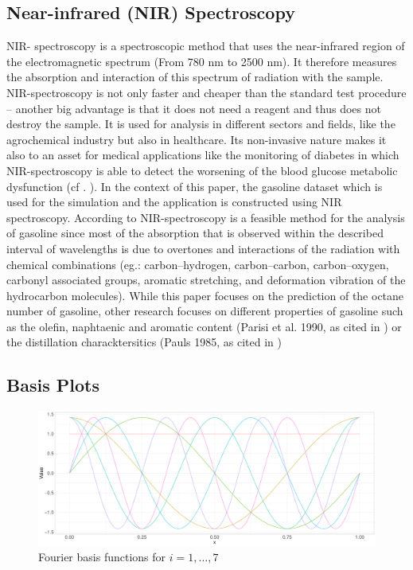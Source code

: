 \documentclass[11pt,twoside,a4paper]{article}
\begin{document}
	\subsection{Near-infrared (NIR) Spectroscopy}
	NIR- spectroscopy is a spectroscopic method that uses the near-infrared region of the electromagnetic spectrum (From 780 nm to 2500 nm). It therefore measures the absorption and interaction of this spectrum of radiation with the sample. NIR-spectroscopy is not only faster and cheaper than the standard test procedure – another big advantage is that it does not need a reagent and thus does not destroy the sample. It is used for analysis in different sectors and fields, like the agrochemical industry but also in healthcare. Its non-invasive nature makes it also to an asset for medical applications like the monitoring of diabetes in which NIR-spectroscopy is able to detect the worsening of the blood glucose metabolic dysfunction (cf . \cite{FR_li_et_al_2020}). In the context of this paper, the gasoline dataset which is used for the simulation and the application is constructed using NIR spectroscopy. According to \cite{Bohacs_Ovadi_Salgo1998} NIR-spectroscopy is a feasible method for the analysis of gasoline since most of the absorption that is observed within the described interval of wavelengths is due to overtones and interactions of the radiation with chemical combinations (eg.: carbon–hydrogen, carbon–carbon, carbon–oxygen, carbonyl associated groups, aromatic stretching, and deformation vibration of the hydrocarbon molecules). While this paper focuses on the prediction of the octane number of gasoline, other research focuses  on different properties of gasoline such as the olefin, naphtaenic and aromatic content (Parisi et al. 1990, as cited in \cite{Bohacs_Ovadi_Salgo1998}) or the distillation characktersitics (Pauls 1985, as cited in \cite{Bohacs_Ovadi_Salgo1998})

	
	\subsection{Basis Plots}
	
	\begin{figure}[H]\label{fourier_basis}
		\includegraphics[width = \textwidth]{../Graphics/Fourier_Basis.pdf}
		\caption{Fourier basis functions for $i = 1,\dots,7$}
	\end{figure}
	
\end{document}
